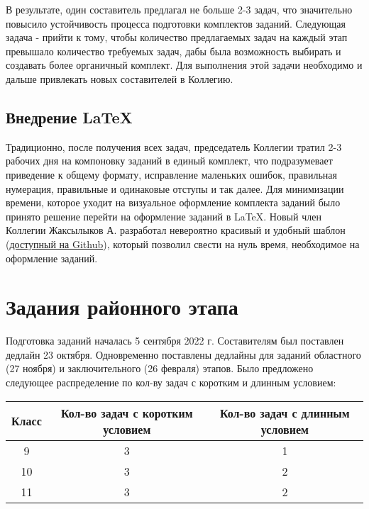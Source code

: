 В результате, один составитель предлагал не больше 2-3 задач, что значительно повысило устойчивость процесса подготовки комплектов заданий. Следующая задача - прийти к тому, чтобы количество предлагаемых задач на каждый этап превышало количество требуемых задач, дабы была возможность выбирать и создавать более органичный комплект. Для выполнения этой задачи необходимо и дальше привлекать новых составителей в Коллегию.

\subsection{Внедрение \LaTeX}

Традиционно, после получения всех задач, председатель Коллегии тратил 2-3 рабочих дня на компоновку заданий в единый комплект, что подразумевает приведение к общему формату, исправление маленьких ошибок, правильная нумерация, правильные и одинаковые отступы и так далее. Для минимизации времени, которое уходит на визуальное оформление комплекта заданий было принято решение перейти на оформление заданий в \LaTeX. Новый член Коллегии Жаксылыков А. разработал невероятно красивый и удобный шаблон (\href{https://github.com/Beyond-Curriculum/qazcho-latex}{доступный на Github}), который позволил свести на нуль время, необходимое на оформление заданий.


\section{Задания районного этапа}
Подготовка заданий началась 5 сентября 2022 г. Составителям был поставлен дедлайн 23 октября. Одновременно поставлены дедлайны для заданий областного (27 ноября) и заключительного (26 февраля) этапов. Было предложено следующее распределение по кол-ву задач с коротким и длинным условием:

\begin{table}[h]
    \centering
    \begin{tabular}{|c|c|c|}
        \hline
        Класс & Кол-во задач с коротким условием & Кол-во задач с длинным условием \\ \hline
        9 & 3 & 1 \\ \hline
        10 & 3 & 2 \\ \hline
        11 & 3 & 2 \\ \hline
    \end{tabular}
    \label{tab:tasks}
\end{table}

